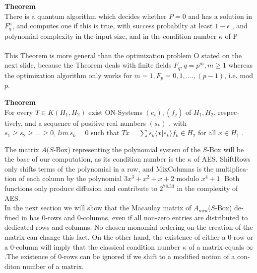 \documentclass[a4paper,11pt]{article}
\begin{document}
\begin{otherlanguage}{english}
\noindent
\textbf{Theorem} \\
There is a quantum algorithm which decides whether $ P = 0 $ and has a solution in $ F_q^n $, 
and computes one if this is true, with success probabilty at least $ 1 - \epsilon $ ,
and polynomial complexity in the input size, and in the condition number $ \kappa $ of P \\ \\

\noindent This Theorem is more general than the optimization problem O stated on the next slide, because the Theorem deals with finite fields $ F_q , q=p^m, m \ge 1 $ whereas the optimization algorithm only works for $ m=1 , F_p ={0,1,....,(p-1)} $, i.e. mod $p$.


\vspace{1.0cm}

\noindent
\textbf{Theorem} \\
For every $ T \in K(H_1,H_2) $ exist ON-Systems $ (e_i) , (f_j) $ of $ H_1 , H_2 $, respectively, and a sequence of positive real numbers
$ (s_k) $ ,  with  $ s_1 \ge s_2 \ge \ldots \ge 0 , \,  lim \, s_k = 0 $  such that
$ Tx = \sum s_k \langle x|e_k \rangle f_k  \in  H_2 $ for all $ x \in H_1 $ .



\vspace{1.0cm}


\vspace{0.3cm}
\noindent
The matrix $A$($S$-Box) representing the polynomial system of the $S$-Box will be the base of our computation, as its condition number is the $\kappa$ of  \textsc{AES}. ShiftRows only shifts terms of the polynomial in a row, and MixColumns is the multiplication of each column by the polynomial $3x^{3}+x^{2}+x+2$ modulo $x^4+1$. Both functions only produce diffusion and contribute to $2^{78.53}$ in the complexity of \textsc{AES}. \\

\noindent
In the next section we will show that the Macaulay matrix of $A_{mca}$($S$-Box) defined in \cite{QAA} has $0$-rows and $0$-columns, even if all non-zero entries are distributed to dedicated rows and columns. No chosen monomial ordering on the creation of the matrix can change this fact. On the other hand, the existence of either a $0$-row or a $0$-column will imply that the classical condition number $\kappa$ of a matrix equals $\infty$.The existence of $0$-rows can be ignored if we shift to a modified notion of a conditon number of a matrix. \\



\end{otherlanguage}
\end{document}
